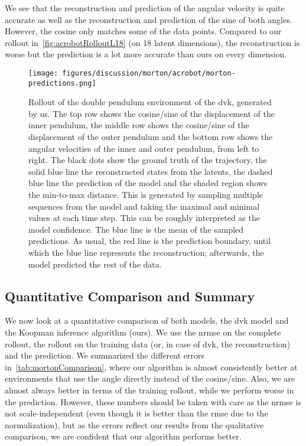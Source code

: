 		We see that the reconstruction and prediction of the angular velocity is quite accurate as well as the reconstruction and prediction of the sine of both angles. However, the cosine only matches some of the data points. Compared to our rollout in~\autoref{fig:acrobotRolloutL18} (on 18 latent dimensions), the reconstruction is worse but the prediction is a lot more accurate than ours on every dimension.

		\begin{figure}
			\centering
			\texttt{[image: figures/discussion/morton/acrobot/morton-predictions.png]}
			\caption[Rollout of the double pendulum environment of the \ac{dvk} model]{Rollout of the double pendulum environment of the \ac{dvk}, generated by us. The top row shows the cosine/sine of the displacement of the inner pendulum, the middle row shows the cosine/sine of the displacement of the outer pendulum and the bottom row shows the angular velocities of the inner and outer pendulum, from left to right. The black dots show the ground truth of the trajectory, the solid blue line the reconstructed states from the latents, the dashed blue line the prediction of the model and the shaded region shows the min-to-max distance. This is generated by sampling multiple sequences from the model and taking the maximal and minimal values at each time step. This can be roughly interpreted as the model confidence. The blue line is the mean of the sampled predictions. As usual, the red line is the prediction boundary, until which the blue line represents the reconstruction; afterwards, the model predicted the rest of the data.}
			\label{fig:mortonAcrobot}
		\end{figure}

	\subsection{Quantitative Comparison and Summary}
		We now look at a quantitative comparison of both models, the \ac{dvk} model and the Koopman inference algorithm (ours). We use the \ac{nrmse} on the complete rollout, the rollout on the training data (or, in case of \ac{dvk}, the reconstruction) and the prediction. We summarized the different errors in~\autoref{tab:mortonComparison}, where our algorithm is almost consistently better at environments that use the angle directly instead of the cosine/sine. Also, we are almost always better in terms of the training rollout, while we perform worse in the prediction. However, these numbers should be taken with care as the \ac{nrmse} is not scale-independent (even though it is better than the \ac{rmse} due to the normalization), but as the errors reflect our results from the qualitative comparison, we are confident that our algorithm performs better.

